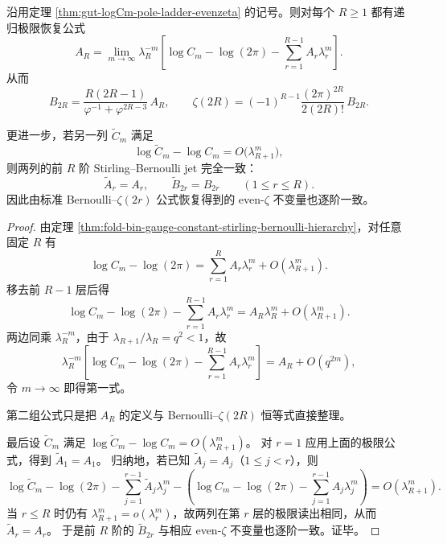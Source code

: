 \begin{theorem}\label{thm:gut-logCm-stirling-bernoulli-jet-rigidity}
沿用定理 \ref{thm:gut-logCm-pole-ladder-evenzeta} 的记号。则对每个 \(R\ge 1\) 都有递归极限恢复公式
\[
\boxed{\;
A_R=
\lim_{m\to\infty}
\lambda_R^{-m}
\left[
\log C_m-\log(2\pi)-\sum_{r=1}^{R-1}A_r\lambda_r^m
\right].\;}
\]
从而
\[
\boxed{\;
B_{2R}
=
\frac{R(2R-1)}{\varphi^{-1}+\varphi^{2R-3}}\,A_R,\qquad
\zeta(2R)
=
(-1)^{R-1}\frac{(2\pi)^{2R}}{2(2R)!}\,B_{2R}.\;}
\]

更进一步，若另一列 \(\widetilde C_m\) 满足
\[
\log \widetilde C_m-\log C_m
=
O\!\bigl(\lambda_{R+1}^{m}\bigr),
\]
则两列的前 \(R\) 阶 Stirling--Bernoulli jet 完全一致：
\[
\widetilde A_r=A_r,\qquad
\widetilde B_{2r}=B_{2r}
\qquad(1\le r\le R).
\]
因此由标准 Bernoulli--\(\zeta(2r)\) 公式恢复得到的 even-\(\zeta\) 不变量也逐阶一致。
\end{theorem}
\begin{proof}
由定理 \ref{thm:fold-bin-gauge-constant-stirling-bernoulli-hierarchy}，对任意固定 \(R\) 有
\[
\log C_m-\log(2\pi)
=
\sum_{r=1}^{R}A_r\lambda_r^m+O(\lambda_{R+1}^m).
\]
移去前 \(R-1\) 层后得
\[
\log C_m-\log(2\pi)-\sum_{r=1}^{R-1}A_r\lambda_r^m
=
A_R\lambda_R^m+O(\lambda_{R+1}^m).
\]
两边同乘 \(\lambda_R^{-m}\)，由于 \(\lambda_{R+1}/\lambda_R=q^2<1\)，故
\[
\lambda_R^{-m}
\left[
\log C_m-\log(2\pi)-\sum_{r=1}^{R-1}A_r\lambda_r^m
\right]
=
A_R+O(q^{2m}),
\]
令 \(m\to\infty\) 即得第一式。

第二组公式只是把 \(A_R\) 的定义与 Bernoulli--\(\zeta(2R)\) 恒等式直接整理。

最后设 \(\widetilde C_m\) 满足
\(
\log \widetilde C_m-\log C_m=O(\lambda_{R+1}^{m})
\)。
对 \(r=1\) 应用上面的极限公式，得到 \(\widetilde A_1=A_1\)。
归纳地，若已知 \(\widetilde A_j=A_j\)（\(1\le j<r\)），则
\[
\log \widetilde C_m-\log(2\pi)-\sum_{j=1}^{r-1}\widetilde A_j\lambda_j^m
-
\left(
\log C_m-\log(2\pi)-\sum_{j=1}^{r-1}A_j\lambda_j^m
\right)
=
O(\lambda_{R+1}^{m}).
\]
当 \(r\le R\) 时仍有 \(\lambda_{R+1}^m=o(\lambda_r^m)\)，故两列在第 \(r\) 层的极限读出相同，从而 \(\widetilde A_r=A_r\)。
于是前 \(R\) 阶的 \(\widetilde B_{2r}\) 与相应 even-\(\zeta\) 不变量也逐阶一致。证毕。
\end{proof}
